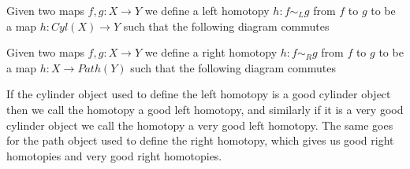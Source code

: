 \begin{definition}
\label{def:left_homotopy}
Given two maps $f,g: X\rightarrow Y$ we define a left homotopy $h:f\sim_L g$ from $f$ to $g$ to be a map $h: Cyl(X)\rightarrow Y$ such that the following diagram commutes
\begin{center}
\end{center}
\end{definition}

\begin{definition}
\label{def:right_homotopy}
Given two maps $f,g: X\rightarrow Y$ we define a right homotopy $h:f\sim_R g$ from $f$ to $g$ to be a map $h: X\rightarrow Path(Y)$ such that the following diagram commutes
\begin{center}
\end{center}
\end{definition}

If the cylinder object used to define the left homotopy is a good cylinder object then we call the homotopy a good left homotopy, and similarly if it is a very good cylinder object we call the homotopy a very good left homotopy. The same goes for the path object used to define the right homotopy, which gives us good right homotopies and very good right homotopies.

